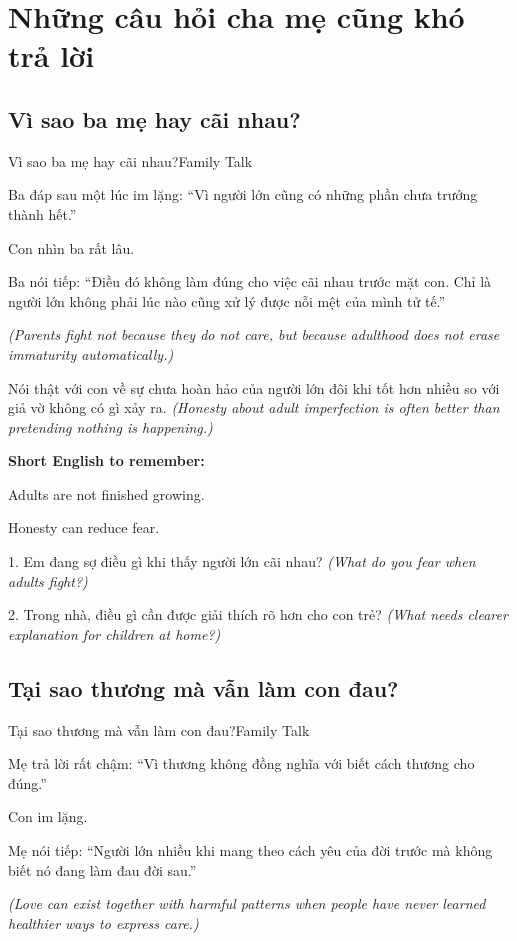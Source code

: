 \chapter{Những câu hỏi cha mẹ cũng khó trả lời}

\section{Vì sao ba mẹ hay cãi nhau?}
\begin{truyen}{Vì sao ba mẹ hay cãi nhau?}{Family Talk}

Ba đáp sau một lúc im lặng: ``Vì người lớn cũng có những phần chưa trưởng thành hết.''

Con nhìn ba rất lâu.

Ba nói tiếp: ``Điều đó không làm đúng cho việc cãi nhau trước mặt con. Chỉ là người lớn không phải lúc nào cũng xử lý được nỗi mệt của mình tử tế.''

\textit{(Parents fight not because they do not care, but because adulthood does not erase immaturity automatically.)}
\end{truyen}

\begin{baihoc}
Nói thật với con về sự chưa hoàn hảo của người lớn đôi khi tốt hơn nhiều so với giả vờ không có gì xảy ra.
\textit{(Honesty about adult imperfection is often better than pretending nothing is happening.)}
\end{baihoc}

\begin{ghinhoanh}
\textbf{Short English to remember:}

Adults are not finished growing.

Honesty can reduce fear.
\end{ghinhoanh}

\begin{tuhocnhanh}
1. Em đang sợ điều gì khi thấy người lớn cãi nhau? \textit{(What do you fear when adults fight?)}

2. Trong nhà, điều gì cần được giải thích rõ hơn cho con trẻ? \textit{(What needs clearer explanation for children at home?)}
\end{tuhocnhanh}
\ngancach

\section{Tại sao thương mà vẫn làm con đau?}
\begin{truyen}{Tại sao thương mà vẫn làm con đau?}{Family Talk}

Mẹ trả lời rất chậm: ``Vì thương không đồng nghĩa với biết cách thương cho đúng.''

Con im lặng.

Mẹ nói tiếp: ``Người lớn nhiều khi mang theo cách yêu của đời trước mà không biết nó đang làm đau đời sau.''

\textit{(Love can exist together with harmful patterns when people have never learned healthier ways to express care.)}
\end{truyen}

